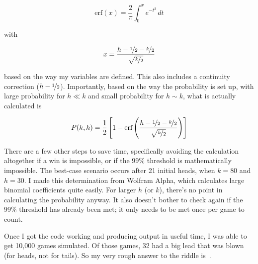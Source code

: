 \documentclass{article}
\begin{document}
\[
\text{erf}(x)=\frac{2}{\pi}\int_{0}^{x}e^{-t^{2}}\,dt
\]

with

\[
x=\frac{h-\nicefrac{1}{2}-\nicefrac{k}{2}}{\sqrt{\nicefrac{k}{2}}}
\]

based on the way my variables are defined.
This also includes a continuity correction ($h-\nicefrac{1}{2}$).
Importantly, based on the way the probability is set up, with large probability for $h\ll k$ and small probability for $h\sim k$, what is actually calculated is

\[
P(k,h)=\frac{1}{2}\left[1-\text{erf}\left(\frac{h-\nicefrac{1}{2}-\nicefrac{k}{2}}{\sqrt{\nicefrac{k}{2}}}\right)\right]
\]

There are a few other steps to save time, specifically avoiding the calculation altogether if a win is impossible, or if the 99\% threshold is mathematically impossible.
The best-case scenario occurs after 21 initial heads, when $k=80$ and $h=30$.
I made this determination from Wolfram Alpha, which calculates large binomial coefficients quite easily.
For larger $h$ (or $k$), there's no point in calculating the probability anyway.
It also doesn't bother to check again if the 99\% threshold has already been met; it only needs to be met once per game to count.

Once I got the code working and producing output in useful time, I was able to get 10,000 games simulated.
Of those games, 32 had a big lead that was blown (for heads, not for tails).
So my very rough answer to the riddle is
\,.
\end{document}

